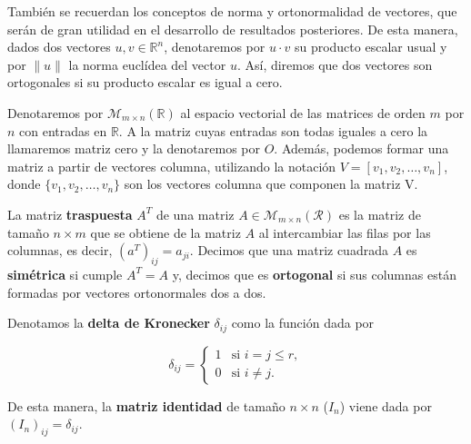 También se recuerdan los conceptos de norma y ortonormalidad de vectores, que serán de gran utilidad en el desarrollo de resultados posteriores. De esta manera, dados dos vectores $u, v \in \mathbb{R}^{n}$, denotaremos por $u \cdot v$ su producto escalar usual y por $\| u \|$ la norma euclídea del vector $u$. Así, diremos que dos vectores son ortogonales si su producto escalar es igual a cero.

Denotaremos por $\mathcal{M}_{m \times n}(\mathbb{R})$ al espacio vectorial de las matrices de orden $m$ por $n$ con entradas en $\mathbb{R}$. A la matriz cuyas entradas son todas iguales a cero la llamaremos matriz cero y la denotaremos por $O$. Además, podemos formar una matriz a partir de vectores columna, utilizando la notación $V = [v_1, v_2, \ldots, v_n]$, donde $\{v_1, v_2, \ldots, v_n\}$ son los vectores columna que componen la matriz V.

\begin{definicion}
    La matriz \textbf{traspuesta} $A^{T}$ de una matriz $A \in \mathcal{M}_{m \times n}(\mathcal{R})$ es la matriz de tamaño $n \times m$ que se obtiene de la matriz $A$ al intercambiar las filas por las columnas, es decir, $(a^{T})_{ij} = a_{ji}$. Decimos que una matriz cuadrada $A$ es \textbf{simétrica} si cumple $A^{T} = A$ y, decimos que es \textbf{ortogonal} si sus columnas están formadas por vectores ortonormales dos a dos.
\end{definicion}

Denotamos la \textbf{delta de Kronecker} $\delta_{ij}$ como la función dada por

\[
    \delta_{ij} =
    \begin{cases}
        1 & \text{si } i = j \leq r, \\
        0 & \text{si } i \neq j.
    \end{cases}
\]

De esta manera, la \textbf{matriz identidad} de tamaño $n \times n$ ($I_{n}$) viene dada por $(I_n)_{ij} = \delta_{ij}$.

